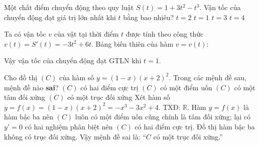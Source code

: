 \begin{ex}%
Một chất điểm chuyển động theo quy luật $S(t)=1+3t^2-t^3$. Vận tốc của chuyển động đạt giá trị lớn nhất khi $t$ bằng bao nhiêu?
\choice
{$t=2$}
{\True $t=1$}
{$t=3$}
{$t=4$}
\loigiai
{
Ta có vận tốc $v$ của vật tại thời điểm $t$ được tính theo công thức $v(t)=S'(t)=-3t^2+6t$. Bảng biến thiên của hàm $v=v(t)$:
\vspace*{-10pt}
\begin{center}
\immini{}
{
}
\end{center}
Vậy vận tốc của chuyển động đạt GTLN khi $t=1$.
}
\end{ex}


\begin{ex}%
Cho đồ thị $(C)$ của hàm số $y=(1-x)(x+2)^2$. Trong các mệnh đề sau, mệnh đề nào \textbf{sai}?
\choice
{$(C)$ có hai điểm cực trị}
{$(C)$ có một điểm uốn}
{$(C)$ có một tâm đối xứng}
{\True $(C)$ có một trục đối xứng}
\loigiai
{Xét hàm số $y=f(x)=(1-x)(x+2)^2=-x^3-3x^2+4$. TXĐ: $\mathbb{R}$.
Hàm $y=f(x)$ là hàm bậc ba nên $(C)$ luôn có một điểm uốn cũng chính là tâm đối xứng; lại có $y'=0$ có hai nghiệm phân biệt nên $(C)$ có hai điểm cực trị. Đồ thị hàm bậc ba không có trục đối xứng. Vậy mệnh đề sai là: ``$C$ có một trục đối xứng.''
}
\end{ex}


